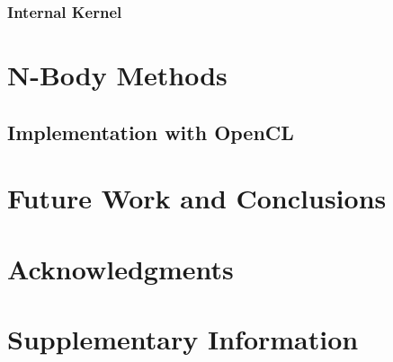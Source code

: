 \documentclass[fleqn,10pt,onecolumn]{ipcc} %
\begin{document}
\subsubsection{Internal Kernel}

\section{N-Body Methods}

\subsection{Implementation with OpenCL}

\section{Future Work and Conclusions}

\section*{Acknowledgments} %





\section*{Supplementary Information} %

\end{document}
